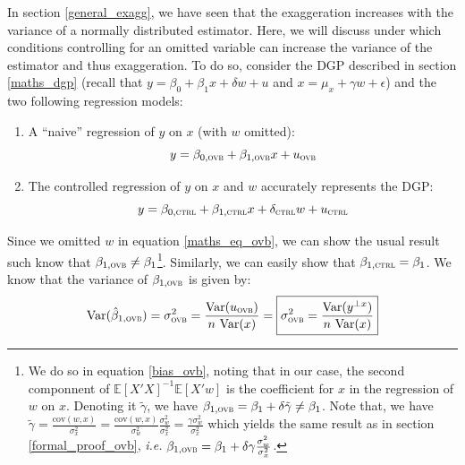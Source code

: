 \documentclass[a4paper, 11pt]{report}
\begin{document}
			In section \ref{general_exagg}, we have seen that the exaggeration increases with the variance of a normally distributed estimator. Here, we will discuss under which conditions controlling for an omitted variable can increase the variance of the estimator and thus exaggeration. To do so, consider the DGP described in section \ref{maths_dgp} (recall that $y = \beta_{0} + \beta_{1} x + \delta w + u$ and $x = \mu_{x} + \gamma w + \epsilon$) and the two following regression models:
			
				\begin{enumerate}
					\item A ``naive'' regression of $y$ on $x$ (with $w$ omitted):
						~
						\begin{equation}\label{maths_eq_ovb}
							y = \beta_{0, \textsc{ovb}} + \beta_{1, \textsc{ovb}}x + u_{\textsc{ovb}}
						\end{equation}
					\item The controlled regression of $y$ on $x$ and $w$ accurately represents the DGP:
						~
						\begin{equation}\label{maths_eq_ctrl}
							y = \beta_{0, \textsc{ctrl}} + \beta_{1, \textsc{ctrl}}x +  \delta_{\textsc{ctrl}} w + u_{\textsc{ctrl}}
						\end{equation}
				\end{enumerate}
				 
			Since we omitted $w$ in equation \ref{maths_eq_ovb}, we can show the usual result such know that $\beta_{1, \textsc{ovb}} \neq \beta_1$\footnote{We do so in equation \ref{bias_ovb}, noting that in our case, the second componnent of $\mathbb{E}[X'X]^{-1} \mathbb{E}[X'w]$ is the coefficient for $x$ in the regression of $w$ on $x$. Denoting it $\tilde{\gamma}$, we have $\beta_{1, \textsc{ovb}} = \beta_{1} + \delta\tilde{\gamma} \neq \beta_1$. Note that, we have $\tilde{\gamma} = \frac{\text{cov}(w,x)}{\sigma_{x}^{2}} =   \frac{\text{cov}(w,x)}{\sigma_{w}^{2}}\frac{\sigma_{w}^{2}}{\sigma_{x}^{2}} = \frac{\gamma \sigma_{w}^{2}}{\sigma_{x}^{2}}$ which yields the same result as in section \ref{formal_proof_ovb}, \textit{i.e.} $\beta_{1, \textsc{ovb}} = \beta_{1} + \delta\gamma\frac{\sigma_{w}^{2}}{\sigma_{x}^{2}}$.}. Similarly, we can easily show that $\beta_{1, \textsc{ctrl}} = \beta_1$. We know that the variance of $\beta_{1, \textsc{ovb}}$ is given by:
			~
			\[
				\text{Var} (\hat{\beta}_{1, \textsc{ovb}}) = \sigma_{\textsc{ovb}}^2 =
				\dfrac{\text{Var}(u_{\textsc{ovb}})}{n \ \text{Var}(x)} = 
				\boxed{
					\sigma_{\textsc{ovb}}^2 = \dfrac{\text{Var}(y^{\perp x})}{n \ \text{Var}(x)}
				}
			\]
			
\end{document}
